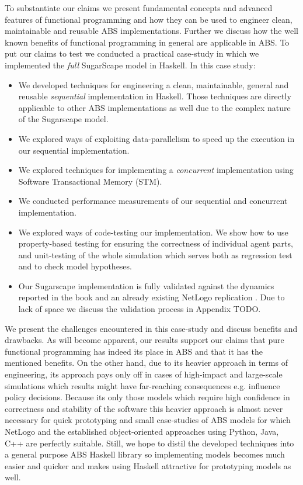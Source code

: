 To substantiate our claims we present fundamental concepts and advanced features of functional programming and how they can be used to engineer clean, maintainable and reusable ABS implementations. Further we discuss how the well known benefits of functional programming in general are applicable in ABS. To put our claims to test we conducted a practical case-study in which we implemented the \textit{full} SugarScape model \cite{epstein_growing_1996} in Haskell. In this case study:
\begin{itemize}
	\item We developed techniques for engineering a clean, maintainable, general and reusable \textit{sequential} implementation in Haskell. Those techniques are directly applicable to other ABS implementations as well due to the complex nature of the Sugarscape model.
	
	\item We explored ways of exploiting data-parallelism to speed up the execution in our sequential implementation.
	
	\item We explored techniques for implementing a \textit{concurrent} implementation using Software Transactional Memory (STM).
	
	\item We conducted performance measurements of our sequential and concurrent implementation.
	
	\item We explored ways of code-testing our implementation. We show how to use property-based testing for ensuring the correctness of individual agent parts, and unit-testing of the whole simulation which serves both as regression test and to check model hypotheses.
	
	\item Our Sugarscape implementation is fully validated against the dynamics reported in the book \cite{epstein_growing_1996} and an already existing NetLogo replication \cite{weaver_replicating_nodate}. Due to lack of space we discuss the validation process in Appendix TODO.
\end{itemize}

We present the challenges encountered in this case-study and discuss benefits and drawbacks. As will become apparent, our results support our claims that pure functional programming has indeed its place in ABS and that it has the mentioned benefits. On the other hand, due to its heavier approach in terms of engineering, its approach pays only off in cases of high-impact and large-scale simulations which results might have far-reaching consequences e.g. influence policy decisions. Because its only those models which require high confidence in correctness and stability of the software this heavier approach is almost never necessary for quick prototyping and small case-studies of ABS models for which NetLogo and the established object-oriented approaches using Python, Java, C++ are perfectly suitable. Still, we hope to distil the developed techniques into a general purpose ABS Haskell library so implementing models becomes much easier and quicker and makes using Haskell attractive for prototyping models as well.
 
